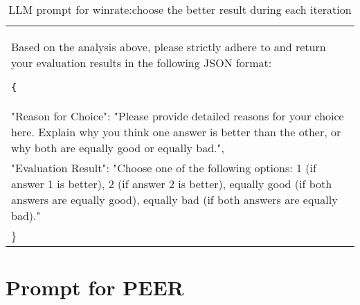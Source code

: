 \documentclass[11pt]{article}
\begin{document}
\begin{table*}[]
\begin{tabular}{p{}}
Based on the analysis above, please strictly adhere to and return your evaluation results in the following JSON format:

\vspace{2mm}

\texttt\{\\
  "Reason for Choice": "Please provide detailed reasons for your choice here. Explain why you think one answer is better than the other, or why both are equally good or equally bad.",\\
  "Evaluation Result": "Choose one of the following options: 1 (if answer 1 is better), 2 (if answer 2 is better), equally good (if both answers are equally good), equally bad (if both answers are equally bad)."\\
\}
\\
\hline
\end{tabular}
\caption{LLM prompt for winrate:choose the better result during each iteration}
\label{tab:winrate-prompt}
\end{table*}

\section{Prompt for PEER}
\label{sec:appendix}
\end{document}
